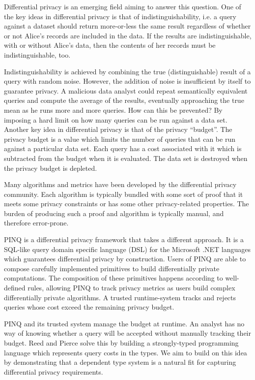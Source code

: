 \documentclass[12pt]{article}
\begin{document}
Differential privacy\cite{journals/cacm/Dwork11} is an emerging field aiming to answer this question.
One of the key ideas in differential privacy is that of indistinguishability, i.e. a query against a dataset should return more-or-less the same result regardless of whether or not Alice's records are included in the data.
If the results are indistinguishable, with or without Alice's data, then the contents of her records must be indistinguishable, too.

Indistinguishability is achieved by combining the true (distinguishable) result of a query with random noise.
However, the addition of noise is insufficient by itself to guarantee privacy.
A malicious data analyst could repeat semantically equivalent queries and compute the average of the results, eventually approaching the true mean as he runs more and more queries.
How can this be prevented?
By imposing a hard limit on how many queries can be run against a data set.
Another key idea in differential privacy is that of the privacy ``budget''.
The privacy budget is a value which limits the number of queries that can be run against a particular data set.
Each query has a cost associated with it which is subtracted from the budget when it is evaluated.
The data set is destroyed when the privacy budget is depleted.

Many algorithms and metrics have been developed by the differential privacy community.
Each algorithm is typically bundled with some sort of proof that it meets some privacy constraints or has some other privacy-related properties.
The burden of producing such a proof and algorithm is typically manual, and therefore error-prone.

PINQ\cite{conf/sigmod/McSherry09} is a differential privacy framework that takes a different approach.
It is a SQL-like query domain specific language (DSL) for the Microsoft .NET languages which guarantees differential privacy by construction.
Users of PINQ are able to compose carefully implemented primitives to build differentially private computations.
The composition of these primitives happens according to well-defined rules, allowing PINQ to track privacy metrics as users build complex differentially private algorithms.
A trusted runtime-system tracks and rejects queries whose cost exceed the remaining privacy budget.

PINQ and its trusted system manage the budget at runtime.
An analyst has no way of knowing whether a query will be accepted without manually tracking their budget.
Reed and Pierce\cite{conf/icfp/ReedP10} solve this by building a strongly-typed programming language which represents query costs in the types.
We aim to build on this idea by demonstrating that a dependent type system is a natural fit for capturing differential privacy requirements.
\end{document}
